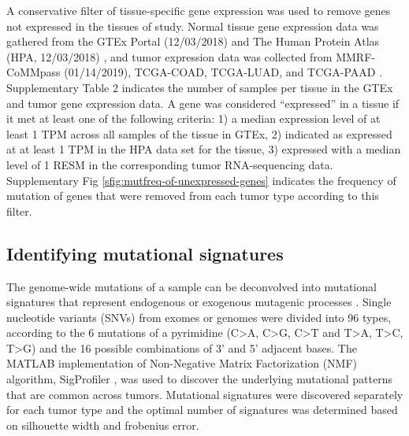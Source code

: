 \documentclass[english, 12pt, letterpaper]{article}
\begin{document}
A conservative filter of tissue-specific gene expression was used to remove genes not expressed in the tissues of study. 
Normal tissue gene expression data was gathered from the GTEx Portal (12/03/2018) \cite{GTExConsortium2017} and The Human Protein Atlas (HPA, 12/03/2018) \cite{Uhlen2015, Uhlen2016}, and tumor expression data was collected from MMRF-CoMMpass (01/14/2019), TCGA-COAD, TCGA-LUAD, and TCGA-PAAD \cite{CancerGenomeAtlasNetwork2012, CancerGenomeAtlasResearchNetwork2014, CancerGenomeAtlasResearchNetwork.Electronicaddress:andrew_aguirredfci.harvard.edu2017}. 
Supplementary Table 2 indicates the number of samples per tissue in the GTEx and tumor gene expression data. %
A gene was considered “expressed” in a tissue if it met at least one of the following criteria: 1) a median expression level of at least 1 TPM across all samples of the tissue in GTEx, 2) indicated as expressed at at least 1 TPM in the HPA data set for the tissue, 3) expressed with a median level of 1 RESM in the corresponding tumor RNA-sequencing data.
Supplementary Fig \ref{sfig:mutfreq-of-unexpressed-genes} indicates the frequency of mutation of genes that were removed from each tumor type according to this filter.


\subsection*{Identifying mutational signatures}

The genome-wide mutations of a sample can be deconvolved into mutational signatures that represent endogenous or exogenous mutagenic processes \cite{Alexandrov2013}. 
Single nucleotide variants (SNVs) from exomes or genomes were divided into 96 types, according to the 6 mutations of a pyrimidine (C>A, C>G, C>T and T>A, T>C, T>G) and the 16 possible combinations of 3’ and 5’ adjacent bases.
The MATLAB implementation of Non-Negative Matrix Factorization (NMF) algorithm, SigProfiler \cite{Alexandrov2013}, was used to discover the underlying mutational patterns that are common across tumors. 
Mutational signatures were discovered separately for each tumor type and the optimal number of signatures was determined based on silhouette width and frobenius error. 
\end{document}
